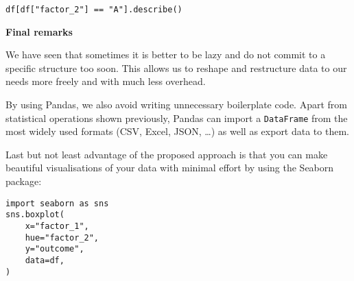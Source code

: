 \begin{lstlisting}
df[df["factor_2"] == "A"].describe()
\end{lstlisting}

\vspace{-8 pt}

\textrm{\textbf{Final remarks}}
\vspace{6 pt}

We have seen that sometimes it is better to be lazy and
do not commit to a specific structure too soon.
This allows us to reshape and restructure data to our needs more
freely and with much less overhead.

\vspace{3 pt}

By using Pandas, we also avoid writing unnecessary boilerplate code.
Apart from statistical operations shown previously,
Pandas can import a \lstinline{DataFrame} from the most widely used formats
(CSV, Excel, JSON, \ldots) as well as export data to them.

\vspace{3 pt}

Last but not least advantage of the proposed approach is that you can make
beautiful visualisations of your data with minimal effort by using
the Seaborn package:

\begin{lstlisting}
import seaborn as sns
sns.boxplot(
    x="factor_1",
    hue="factor_2",
    y="outcome",
    data=df,
)
\end{lstlisting}
